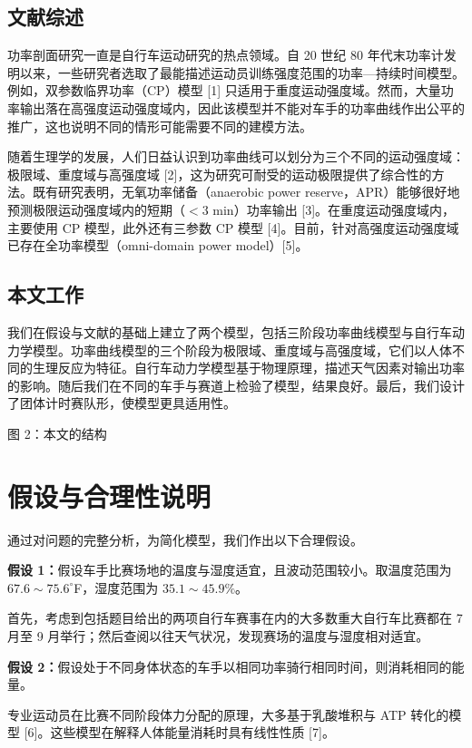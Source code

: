\documentclass[11pt,a4paper]{ctexart}
\begin{document}
\subsection{文献综述}

功率剖面研究一直是自行车运动研究的热点领域。自 20 世纪 80 年代末功率计发明以来，一些研究者选取了最能描述运动员训练强度范围的功率—持续时间模型。例如，双参数临界功率（CP）模型 [1] 只适用于重度运动强度域。然而，大量功率输出落在高强度运动强度域内，因此该模型并不能对车手的功率曲线作出公平的推广，这也说明不同的情形可能需要不同的建模方法。

随着生理学的发展，人们日益认识到功率曲线可以划分为三个不同的运动强度域：极限域、重度域与高强度域 [2]，这为研究可耐受的运动极限提供了综合性的方法。既有研究表明，无氧功率储备（anaerobic power reserve，APR）能够很好地预测极限运动强度域内的短期（$<3$ min）功率输出 [3]。在重度运动强度域内，主要使用 CP 模型，此外还有三参数 CP 模型 [4]。目前，针对高强度运动强度域已存在全功率模型（omni-domain power model）[5]。

\subsection{本文工作}

我们在假设与文献的基础上建立了两个模型，包括三阶段功率曲线模型与自行车动力学模型。功率曲线模型的三个阶段为极限域、重度域与高强度域，它们以人体不同的生理反应为特征。自行车动力学模型基于物理原理，描述天气因素对输出功率的影响。随后我们在不同的车手与赛道上检验了模型，结果良好。最后，我们设计了团体计时赛队形，使模型更具适用性。

图 2：本文的结构

\section{假设与合理性说明}

通过对问题的完整分析，为简化模型，我们作出以下合理假设。

\textbf{假设 1：}假设车手比赛场地的温度与湿度适宜，且波动范围较小。取温度范围为 $67.6\sim 75.6^{\circ}$F，湿度范围为 $35.1\sim 45.9\%$。

首先，考虑到包括题目给出的两项自行车赛事在内的大多数重大自行车比赛都在 7 月至 9 月举行；然后查阅以往天气状况，发现赛场的温度与湿度相对适宜。

\textbf{假设 2：}假设处于不同身体状态的车手以相同功率骑行相同时间，则消耗相同的能量。

专业运动员在比赛不同阶段体力分配的原理，大多基于乳酸堆积与 ATP 转化的模型 [6]。这些模型在解释人体能量消耗时具有线性性质 [7]。
\end{document}
